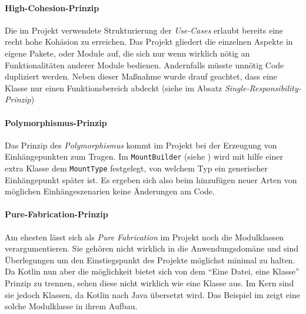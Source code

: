 \paragraph{High-Cohesion-Prinzip}

Die im Projekt verwendete Strukturierung der \emph{Use-Cases} erlaubt bereits eine recht hohe Kohäsion zu erreichen.
Das Projekt gliedert die einzelnen Aspekte in eigene Pakete, oder Module auf, die sich nur wenn wirklich nötig an Funktionalitäten anderer Module bedienen.
Andernfalls müsste unnötig Code dupliziert werden.
Neben dieser Maßnahme wurde drauf geachtet, dass eine Klasse nur einen Funktionsbereich abdeckt (siehe  im Absatz \emph{Single-Responsibility-Prinzip})

\paragraph{Polymorphismus-Prinzip}

Das Prinzip des \emph{Polymorphismus} kommt im Projekt bei der Erzeugung von Einhängepunkten zum Tragen.
Im \texttt{MountBuilder} (siehe ) wird mit hilfe einer extra Klasse dem \texttt{MountType} festgelegt, von welchem Typ ein generischer Einhängepunkt später ist.
Es ergeben sich also beim hinzufügen neuer Arten von möglichen Einhängeszenarien keine Änderungen am Code.

\bgroup

    \label{lst:mount_builder}
\egroup

\paragraph{Pure-Fabrication-Prinzip}

Am ehesten lässt sich als \emph{Pure Fabrication} im Projekt noch die Modulklassen verargumentieren.
Sie gehören nicht wirklich in die Anwendungsdomäne und sind Überlegungen um den Einstiegspunkt des Projekte möglichst minimal zu halten.
Da Kotlin nun aber die möglichkeit bietet sich von dem \enquote{Eine Datei, eine Klasse} Prinzip zu trennen, sehen diese nicht wirklich wie eine Klasse aus.
Im Kern sind sie jedoch Klassen, da Kotlin nach Java übersetzt wird.
Das Beispiel im  zeigt eine solche Modulklasse in ihrem Aufbau.

\bgroup

